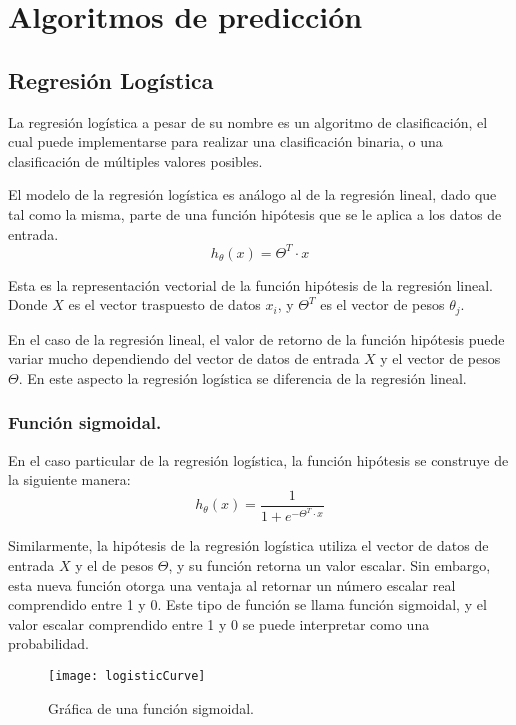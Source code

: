 
\section{Algoritmos de predicción} %
\label{sec:algoritmos_de_prediccion}

\subsection{Regresión Logística} %
\label{sub:regresion_logistica}

La regresión logística a pesar de su nombre es un algoritmo de clasificación, el cual puede implementarse para realizar una clasificación binaria, o una clasificación de múltiples valores posibles.

El modelo de la regresión logística es análogo al de la regresión lineal, dado que tal como la misma, parte de una función hipótesis que se le aplica a los datos de entrada.
\begin{equation}
h_{\theta}(x)= \Theta^T \cdot x
\end{equation}
\begin{small}
Esta es la representación vectorial de la función hipótesis de la regresión lineal. Donde $X$ es el vector traspuesto de datos $x_{i}$, y $\Theta^T$ es el vector de pesos $\theta_{j}$.
\end{small} \newline

En el caso de la regresión lineal, el valor de retorno de la función hipótesis puede variar mucho dependiendo del vector de datos de entrada $X$ y el vector de pesos $\Theta$. En este aspecto la regresión logística se diferencia de la regresión lineal.

\subsubsection{Función sigmoidal.}
En el caso particular de la regresión logística, la función hipótesis se construye de la siguiente manera:
\begin{equation}
h_{\theta}(x)= \frac{1}{1+e^{- \Theta^T\cdot x }}
\end{equation}

Similarmente, la hipótesis de la regresión logística utiliza el vector de datos de entrada $X$ y el de pesos $\Theta$, y su función retorna un valor escalar. Sin embargo, esta nueva función otorga una ventaja al retornar un número escalar real comprendido entre 1 y 0. Este tipo de función se llama función sigmoidal, y el valor escalar comprendido entre 1 y 0 se puede interpretar como una probabilidad.
\begin{figure}[H]
\centering
\texttt{[image: logisticCurve]}
\caption{Gráfica de una función sigmoidal.}
\label{fig:logisticCurve}
\end{figure}

